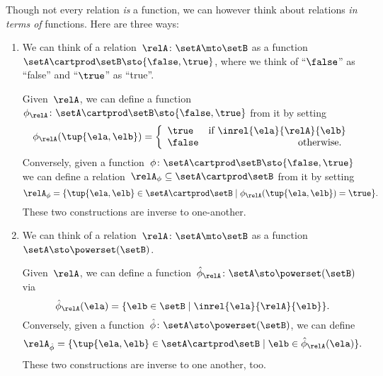     \label{rem:rel-three-fun-descriptions}
    Though not every relation \emph{is} a function, we can however think about relations \emph{in terms of} functions.
    Here are three ways:
    \begin{enumerate}
        \item We can think of a relation~$\relA \colon \setA \mto\setB$ as a function~$\setA \cartprod \setB \sto \{ \false, \true \}$, where we think of ``$\false$'' as ``false'' and ``$\true$'' as ``true''.

              Given~$\relA$, we can define a function~$\phi_{\relA} \colon \setA \cartprod \setB \sto \{ \false, \true \}$ from it by setting
              \begin{equation}
                  \phi_{\relA}(\tup{\ela, \elb}) =
                  \left
                  \{\begin{array}{lr}
                      \true  & \text{if } \inrel{\ela}{\relA}{\elb} \\
                      \false & \text{otherwise.
                      }
                  \end{array}
                  \right.
              \end{equation}
              Conversely, given a function~$\phi\colon \setA \cartprod \setB \sto \{ \false, \true \}$ we can define a relation~$\relA_{\phi} \subseteq \setA \cartprod \setB$ from it by setting
              \begin{equation}
                  \relA_{\phi} = \{ \tup{\ela, \elb} \in \setA \cartprod \setB \mid \phi_{\relA}(\tup{\ela, \elb}) = \true \}.
              \end{equation}
              These two constructions are inverse to one-another.

        \item We can think of a relation~$\relA \colon \setA \mto \setB$ as a function~$\setA  \sto \powerset (\setB)$.

              Given~$\relA$, we can define a function~$\hat \phi_{\relA} \colon \setA \sto \powerset (\setB)$ via
              \begin{equation}
                  \hat \phi_{\relA} (\ela) = \{ \elb \in \setB \mid \inrel{\ela}{\relA}{\elb}\}.
              \end{equation}
              Conversely, given a function~$\hat \phi \colon \setA \sto \powerset (\setB)$, we can define
              \begin{equation}
                  \relA_{\hat \phi} = \{ \tup{\ela, \elb} \in \setA \cartprod \setB \mid \elb \in \hat \phi_{\relA}(\ela)   \}.
              \end{equation}
              These two constructions are inverse to one another, too.


\end{enumerate}
